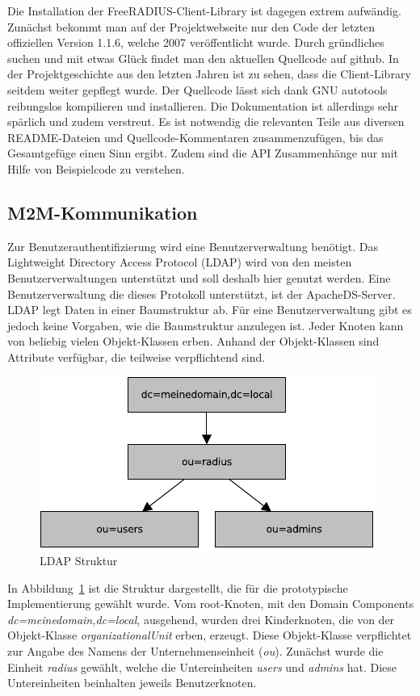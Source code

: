 \documentclass[11pt,a4paper]{report}
\begin{document}
Die Installation der FreeRADIUS-Client-Library ist dagegen extrem aufwändig. Zunächst bekommt man auf der Projektwebseite nur den Code der letzten offiziellen Version 1.1.6, welche 2007 veröffentlicht wurde. Durch gründliches suchen und mit etwas Glück findet man den aktuellen Quellcode auf github. In der Projektgeschichte aus den letzten Jahren ist zu sehen, dass die Client-Library seitdem weiter gepflegt wurde. Der Quellcode lässt sich dank GNU autotools reibungslos kompilieren und installieren. Die Dokumentation ist allerdings sehr spärlich und zudem verstreut. Es ist notwendig die relevanten Teile aus diversen README-Dateien und Quellcode-Kommentaren zusammenzufügen, bis das Gesamtgefüge einen Sinn ergibt. Zudem sind die API Zusammenhänge nur mit Hilfe von Beispielcode zu verstehen.

\subsection{M2M-Kommunikation}

Zur Benutzerauthentifizierung wird eine Benutzerverwaltung benötigt. Das Lightweight Directory Access Protocol (LDAP) wird von den meisten Benutzerverwaltungen unterstützt und soll deshalb hier genutzt werden. Eine Benutzerverwaltung die dieses Protokoll unterstützt, ist der ApacheDS-Server. LDAP legt Daten in einer Baumstruktur ab. Für eine Benutzerverwaltung gibt es jedoch keine Vorgaben, wie die Baumstruktur anzulegen ist. Jeder Knoten kann von beliebig vielen Objekt-Klassen erben. Anhand der Objekt-Klassen sind Attribute verfügbar, die teilweise verpflichtend sind. 
\begin{figure}[htbp]
\centering
\includegraphics[scale=1]{images/ldap_structure.pdf}
\caption{LDAP Struktur}
\label{fig:ldap_sturcture}
\end{figure}
In Abbildung~\ref{fig:ldap_sturcture} ist die Struktur dargestellt, die für die prototypische Implementierung gewählt wurde. Vom root-Knoten, mit den Domain Components \textit{dc=meinedomain,dc=local}, ausgehend, wurden drei Kinderknoten, die von der Objekt-Klasse \textit{organizationalUnit} erben, erzeugt. Diese Objekt-Klasse verpflichtet zur Angabe des Namens der Unternehmenseinheit (\textit{ou}). Zunächst wurde die Einheit \textit{radius} gewählt, welche die Untereinheiten \textit{users} und \textit{admins} hat. Diese Untereinheiten beinhalten jeweils Benutzerknoten.
\end{document}
